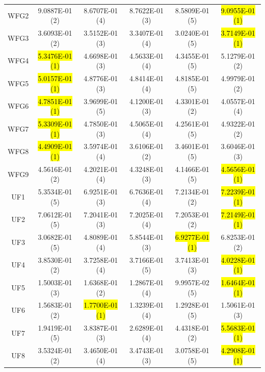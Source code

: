\documentclass[journal]{IEEEtran}
\begin{document}
\begin{table}[tbp]
\begin{tabular}{cccccc}
    WFG2            & 9.0887E-01 (2)      & 8.6707E-01 (4)      & 8.7622E-01 (3)    & 8.5809E-01 (5)      & \hl{9.0955E-01 (1)} \\
    WFG3            & 3.6093E-01 (2)      & 3.5152E-01 (3)      & 3.3407E-01 (4)    & 3.0240E-01 (5)      & \hl{3.7149E-01 (1)} \\
    WFG4            & \hl{5.3476E-01 (1)} & 4.6698E-01 (3)      & 4.5633E-01 (4)    & 4.3455E-01 (5)      & 5.1279E-01 (2)      \\
    WFG5            & \hl{5.0157E-01 (1)} & 4.8776E-01 (3)      & 4.8414E-01 (4)    & 4.8185E-01 (5)      & 4.9979E-01 (2)      \\
    WFG6            & \hl{4.7851E-01 (1)} & 3.9699E-01 (5)      & 4.1200E-01 (3)    & 4.3301E-01 (2)      & 4.0557E-01 (4)      \\
    WFG7            & \hl{5.3309E-01 (1)} & 4.7850E-01 (3)      & 4.5065E-01 (4)    & 4.2561E-01 (5)      & 4.9322E-01 (2)      \\
    WFG8            & \hl{4.4909E-01 (1)} & 3.5974E-01 (4)      & 3.6106E-01 (2)    & 3.4601E-01 (5)      & 3.6046E-01 (3)      \\
    WFG9            & 4.5616E-01 (2)      & 4.2021E-01 (4)      & 4.3248E-01 (3)    & 4.1466E-01 (5)      & \hl{4.5656E-01 (1)} \\
    \hline
    UF1             & 5.3534E-01 (5)      & 6.9251E-01 (3)      & 6.7636E-01 (4)    & 7.2134E-01 (2)      & \hl{7.2239E-01 (1)} \\
    UF2             & 7.0612E-01 (5)      & 7.2041E-01 (3)      & 7.2025E-01 (4)    & 7.2053E-01 (2)      & \hl{7.2149E-01 (1)} \\
    UF3             & 3.0682E-01 (5)      & 4.8089E-01 (4)      & 5.8544E-01 (3)    & \hl{6.9277E-01 (1)} & 6.8253E-01 (2)      \\
    UF4             & 3.8530E-01 (2)      & 3.7258E-01 (4)      & 3.7166E-01 (5)    & 3.7413E-01 (3)      & \hl{4.0228E-01 (1)} \\
    UF5             & 1.5003E-01 (3)      & 1.6368E-01 (2)      & 1.2867E-01 (4)    & 9.9957E-02 (5)      & \hl{1.6464E-01 (1)} \\
    UF6             & 1.5683E-01 (2)      & \hl{1.7700E-01 (1)} & 1.3239E-01 (4)    & 1.2928E-01 (5)      & 1.5061E-01 (3)      \\
    UF7             & 1.9419E-01 (5)      & 3.8387E-01 (3)      & 2.6289E-01 (4)    & 4.4318E-01 (2)      & \hl{5.5683E-01 (1)} \\
    UF8             & 3.5324E-01 (2)      & 3.4650E-01 (4)      & 3.4743E-01 (3)    & 3.0758E-01 (5)      & \hl{4.2908E-01 (1)} \\

\end{tabular}
\end{table}
\end{document}
